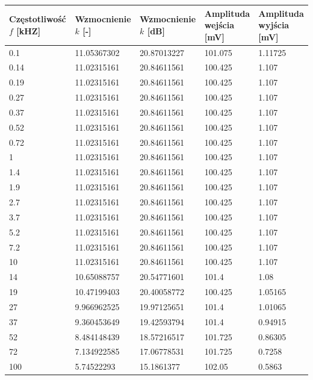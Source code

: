 \documentclass[a4paper,12pt]{article}
\begin{document}
\begin{justify}
\begin{center}
\begin{tabular}{ |p{3cm}|p{3cm}|p{3cm}|p{3cm}|p{3cm}| }
\hline
\makecell{Częstotliwość \\ $f$ [kHZ]} & \makecell{Wzmocnienie \\ $k$ [-]} & \makecell{Wzmocnienie \\ $k$ [dB]} & \makecell{Amplituda \\ wejścia [mV]} & \makecell{Amplituda \\ wyjścia [mV]} \\
\hline
0.1 & 11.05367302 & 20.87013227 & 101.075 & 1.11725 \\
0.14 & 11.02315161 & 20.84611561 & 100.425 & 1.107 \\
0.19 & 11.02315161 & 20.84611561 & 100.425 & 1.107 \\
0.27 & 11.02315161 & 20.84611561 & 100.425 & 1.107 \\
0.37 & 11.02315161 & 20.84611561 & 100.425 & 1.107 \\
0.52 & 11.02315161 & 20.84611561 & 100.425 & 1.107 \\
0.72 & 11.02315161 & 20.84611561 & 100.425 & 1.107 \\
1 & 11.02315161 & 20.84611561 & 100.425 & 1.107 \\
1.4 & 11.02315161 & 20.84611561 & 100.425 & 1.107 \\
1.9 & 11.02315161 & 20.84611561 & 100.425 & 1.107 \\
2.7 & 11.02315161 & 20.84611561 & 100.425 & 1.107 \\
3.7 & 11.02315161 & 20.84611561 & 100.425 & 1.107 \\
5.2 & 11.02315161 & 20.84611561 & 100.425 & 1.107 \\
7.2 & 11.02315161 & 20.84611561 & 100.425 & 1.107 \\
10 & 11.02315161 & 20.84611561 & 100.425 & 1.107 \\
14 & 10.65088757 & 20.54771601 & 101.4 & 1.08 \\
19 & 10.47199403 & 20.40058772 & 100.425 & 1.05165 \\
27 & 9.966962525 & 19.97125651 & 101.4 & 1.01065 \\
37 & 9.360453649 & 19.42593794 & 101.4 & 0.94915 \\
52 & 8.484148439 & 18.57216517 & 101.725 & 0.86305 \\
72 & 7.134922585 & 17.06778531 & 101.725 & 0.7258 \\
100 & 5.74522293 & 15.1861377 & 102.05 & 0.5863 \\

\end{tabular}
\end{center}
\end{justify}
\end{document}
